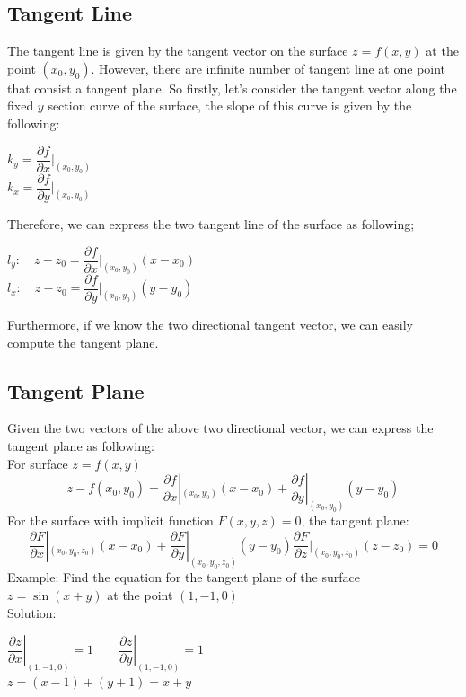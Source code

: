 \documentclass[UTF8,a4paper, 10pt, openany]{book}
\begin{document}
\subsection{Tangent Line}
The tangent line is given by the tangent vector on the surface $z=f(x,y)$ at the point $(x_0,y_0)$. However, there are infinite number of tangent line at one point that consist a tangent plane. So firstly, let's consider the tangent vector along the fixed $y$ section curve of the surface, the slope of this curve is given by the following:
\begin{center}
$k_y=\dfrac{\partial f}{\partial x}|_{(x_0,y_0)}$\\
$k_x=\dfrac{\partial f}{\partial y}|_{(x_0,y_0)}$
\end{center}
Therefore, we can express the two tangent line of the surface as following;
\begin{center}
$l_{y}: \quad z-z_0=\dfrac{\partial f}{\partial x}|_{(x_0,y_0)}(x-x_0)$\\
$l_{x}: \quad z-z_0=\dfrac{\partial f}{\partial y}|_{(x_0,y_0)}(y-y_0)$
\end{center}
Furthermore, if we know the two directional tangent vector, we can easily compute the tangent plane.
\subsection{Tangent Plane}
Given the two vectors of the above two directional vector, we can express the tangent plane as following: \\For surface $z=f(x,y)$
\begin{equation}
\boxed{z-f(x_0,y_0)=\dfrac{\partial f}{\partial x}|_{(x_0,y_0)}(x-x_0)+\dfrac{\partial f}{\partial y}|_{(x_0,y_0)}(y-y_0)}
\end{equation}
For the surface with implicit function $F(x,y,z)=0$, the tangent plane:
\begin{equation}
\boxed{\dfrac{\partial F}{\partial x}|_{(x_0,y_0,z_0)}(x-x_0)+\dfrac{\partial F}{\partial y}|_{(x_0,y_0,z_0)}(y-y_0)\dfrac{\partial F}{\partial z}|_{(x_0,y_0,z_0)}(z-z_0)=0}
\end{equation}
Example: Find the equation for the tangent plane of the surface $z=\sin (x+y)$ at the point $(1,-1,0)$
\\Solution:
\begin{center}
$\left. \dfrac{\partial z}{\partial x} \right|_{(1,-1,0)}=1 \qquad \left. \dfrac{\partial z}{\partial y} \right|_{(1,-1,0)}=1$\\
$z=(x-1)+(y+1)=x+y$
\end{center}
\end{document}
